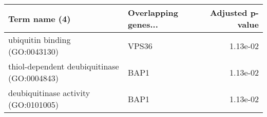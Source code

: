 \begin{tabular}{llr}
\toprule
                              Term name (4) & Overlapping genes... &  Adjusted p-value \\
\midrule
             ubiquitin binding (GO:0043130) &                VPS36 &          1.13e-02 \\
thiol-dependent deubiquitinase (GO:0004843) &                 BAP1 &          1.13e-02 \\
       deubiquitinase activity (GO:0101005) &                 BAP1 &          1.13e-02 \\
\bottomrule
\end{tabular}
